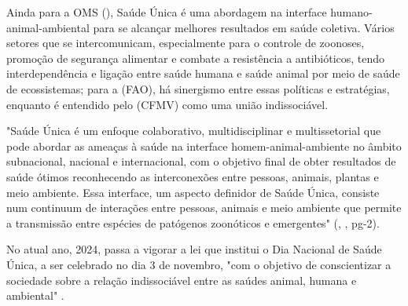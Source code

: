 
\indent Ainda para a \acrshort{OMS} (\citeyear{OMS2024S1}), Saúde Única é uma abordagem na interface humano-animal-ambiental para se alcançar melhores resultados em saúde coletiva. Vários setores que se intercomunicam, especialmente para o controle de zoonoses, promoção de segurança alimentar e combate a resistência a antibióticos, tendo interdependência e ligação entre saúde humana e saúde animal por meio de saúde de ecossistemas; para a  (\acrshort{FAO}), há sinergismo entre essas políticas e estratégias, enquanto é entendido pelo  (\acrshort{CFMV}) como uma união indissociável.

\begin{citacao}
"Saúde Única é um enfoque colaborativo, multidisciplinar e multissetorial que pode abordar as ameaças à saúde na interface homem-animal-ambiente no âmbito subnacional, nacional e internacional, com o objetivo final de obter resultados de saúde ótimos reconhecendo as interconexões entre pessoas, animais, plantas e meio ambiente. Essa  interface, um aspecto definidor de Saúde Única, consiste num continuum de interações entre pessoas, animais e meio ambiente que permite a transmissão entre espécies de patógenos zoonóticos e emergentes" (\citeauthor{S1_OPAS_OMS}, \citeyear{S1_OPAS_OMS}, pg-2).
\end{citacao}


\indent No atual ano, 2024, passa a vigorar a lei que institui o Dia Nacional de Saúde Única, a ser celebrado no dia 3 de novembro, "com o objetivo de conscientizar a sociedade sobre a relação indissociável entre as saúdes animal, humana e ambiental" \cite{BRASIL2024LeiS1}.

